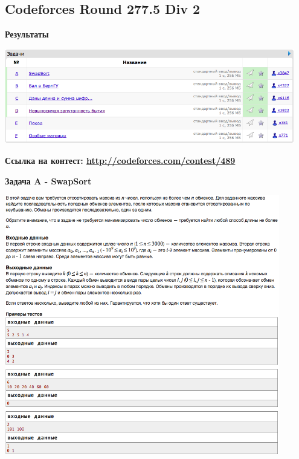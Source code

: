 \documentclass[a4paper,12pt]{article}
\begin{document}
%
%

\newpage
\subsection{Codeforces Round 277.5 Div 2}

\textbf{{\large Результаты}} \\
\begin{center}
\includegraphics[width=0.95\textwidth]{C_277_5/A_C_277_5_result.png}\\ [1cm]
\end{center}

\textbf{{\large Ссылка на контест: \url{http://codeforces.com/contest/489}}}

\newpage
\textbf{{\large Задача A - SwapSort}} \\
\begin{center}
\includegraphics[width=0.9\textwidth]{C_277_5/C_277_5_A.png}\\ [1cm]
\end{center}
\end{document}
